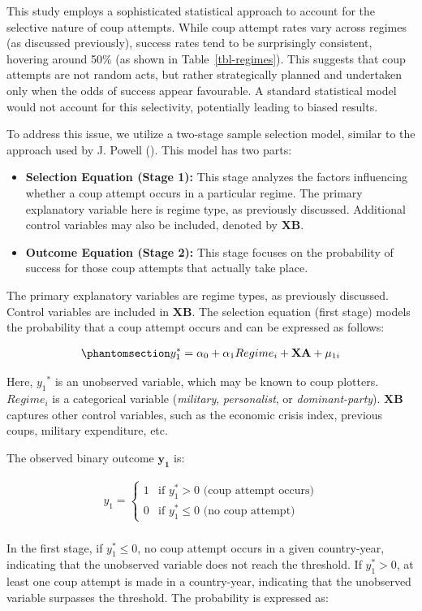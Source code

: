 \documentclass[
  12pt,
]{report}
\begin{document}
This study employs a sophisticated statistical approach to account for
the selective nature of coup attempts. While coup attempt rates vary
across regimes (as discussed previously), success rates tend to be
surprisingly consistent, hovering around 50\% (as shown in
Table~\ref{tbl-regimes}). This suggests that coup attempts are not
random acts, but rather strategically planned and undertaken only when
the odds of success appear favourable. A standard statistical model
would not account for this selectivity, potentially leading to biased
results.

To address this issue, we utilize a two-stage sample selection model,
similar to the approach used by J. Powell
(). This model has two parts:

\begin{itemize}
\item
  \textbf{Selection Equation (Stage 1):} This stage analyzes the factors
  influencing whether a coup attempt occurs in a particular regime. The
  primary explanatory variable here is regime type, as previously
  discussed. Additional control variables may also be included, denoted
  by \(\mathbf{XB}\).
\item
  \textbf{Outcome Equation (Stage 2):} This stage focuses on the
  probability of success for those coup attempts that actually take
  place.
\end{itemize}

The primary explanatory variables are regime types, as previously
discussed. Control variables are included in \(\mathbf{XB}\). The
selection equation (first stage) models the probability that a coup
attempt occurs and can be expressed as follows:

\begin{equation}\phantomsection\label{eq-eq4}{
\begin{aligned}
y_1^*=\alpha_0 + \alpha_1 Regime_i + \mathbf {XA} + \mu_{1i}
\end{aligned}
}\end{equation}

Here, \({y_1}^*\) is an unobserved variable, which may be known to coup
plotters. \(Regime_i\) is a categorical variable (\emph{military},
\emph{personalist}, or \emph{dominant-party}). \(\mathbf{XB}\) captures
other control variables, such as the economic crisis index, previous
coups, military expenditure, etc.

The observed binary outcome \(\mathbf{y_1}\) is:

\[
\begin{aligned}
y_1 = 
\begin{cases} 
1 &\text{if $y_1^*>0$ (coup attempt occurs)} \\
0 &\text{if $y_1^*\le0$ (no coup attempt)}
\end{cases}
\end{aligned}
\]\\
In the first stage, if \(y_1^*\le0\), no coup attempt occurs in a given
country-year, indicating that the unobserved variable does not reach the
threshold. If \(y_1^*>0\), at least one coup attempt is made in a
country-year, indicating that the unobserved variable surpasses the
threshold. The probability is expressed as:
\end{document}
